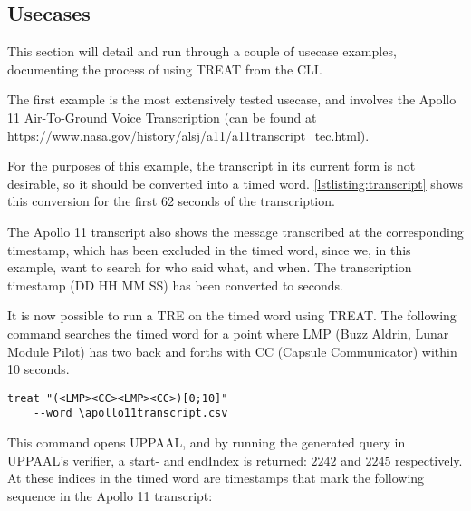 \subsection{Usecases}\label{subsec:usecases}


This section will detail and run through a couple of usecase examples, documenting the process of using TREAT from the CLI.

\vspace{.5\baselineskip plus 2pt}
The first example is the most extensively tested usecase, and involves the Apollo 11 Air-To-Ground Voice Transcription (can be found at \url{https://www.nasa.gov/history/alsj/a11/a11transcript_tec.html}).

For the purposes of this example, the transcript in its current form is not desirable, so it should be converted into a timed word. \cref{lstlisting:transcript} shows this conversion for the first 62 seconds of the transcription.



The Apollo 11 transcript also shows the message transcribed at the corresponding timestamp, which has been excluded in the timed word, since we, in this example, want to search for who said what, and when. The transcription timestamp (DD HH MM SS) has been converted to seconds.

\vspace{.5\baselineskip plus 2pt}
It is now possible to run a TRE on the timed word using TREAT. The following command searches the timed word for a point where LMP (Buzz Aldrin, Lunar Module Pilot) has two back and forths with CC (Capsule Communicator) within 10 seconds.

\vspace{0.75em}
\begin{minipage}{\columnwidth}
    \begin{lstlisting}[basicstyle=\scriptsize\ttfamily]
    treat "(<LMP><CC><LMP><CC>)[0;10]"
    --word \apollo11transcript.csv
            \end{lstlisting}
\end{minipage}
\vspace{-1em}
\label{lstlisting:lmpcctre}
\vspace{0.75em}

This command opens UPPAAL, and by running the generated query in UPPAAL's verifier, a start- and endIndex is returned: $2242$ and $2245$ respectively. At these indices in the timed word are timestamps that mark the following sequence in the Apollo 11 transcript:

